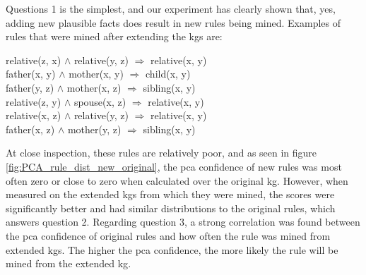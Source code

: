 Questions 1 is the simplest, and our experiment has clearly shown that, yes, adding new plausible facts does result in new rules being mined. Examples of rules that were mined after extending the \glspl{kg} are:
                            \begin{center}
                            relative(z, x) $\wedge$ relative(y, z) $\Rightarrow$ relative(x, y) \\
                          father(x, y) $\wedge$ mother(x, y) $\Rightarrow$ child(x, y) \\
                            father(y, z) $\wedge$ mother(x, z) $\Rightarrow$ sibling(x, y) \\
                            relative(z, y) $\wedge$ spouse(x, z) $\Rightarrow$ relative(x, y) \\
                             relative(x, z) $\wedge$ relative(y, z) $\Rightarrow$ relative(x, y) \\
                            father(x, z) $\wedge$ mother(y, z) $\Rightarrow$ sibling(x, y) \\
                             \end{center}
At close inspection, these rules are relatively poor, and as seen in figure \ref{fig:PCA_rule_dist_new_original}, the \gls{pca} confidence of new rules was most often zero or close to zero when calculated over the original \gls{kg}. However, when measured on the extended \glspl{kg} from which they were mined, the scores were significantly better and had similar distributions to the original rules, which answers question 2. Regarding question 3, a strong correlation was found between the \gls{pca} confidence of original rules and how often the rule was mined from extended \glspl{kg}. The higher the \gls{pca} confidence, the more likely the rule will be mined from the extended \gls{kg}.


